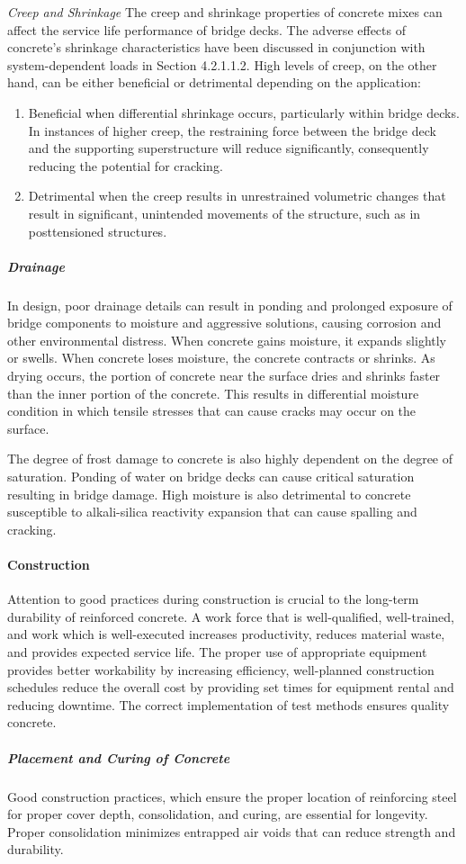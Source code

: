 \emph{Creep and Shrinkage} The creep and shrinkage properties of concrete mixes can affect the service life performance of bridge decks. The adverse effects of concrete’s shrinkage characteristics have been discussed in conjunction with system-dependent loads in Section 4.2.1.1.2. High levels of creep, on the other hand, can be either beneficial or detrimental depending on the application: 
\begin{enumerate}
  \item Beneficial when differential shrinkage occurs, particularly within bridge decks. In instances of higher creep, the restraining force between the bridge deck and the supporting superstructure will reduce significantly, consequently reducing the potential for cracking. 
  \item Detrimental when the creep results in unrestrained volumetric changes that result in significant, unintended movements of the structure, such as in posttensioned structures.
\end{enumerate}


\subparagraph{Drainage}

In design, poor drainage details can result in ponding and prolonged exposure of bridge components to moisture and aggressive solutions, causing corrosion and other environmental distress. When concrete gains moisture, it expands slightly or swells. When concrete loses moisture, the concrete contracts or shrinks. As drying occurs, the portion of concrete near the surface dries and shrinks faster than the inner portion of the concrete. This results in differential moisture condition in which tensile stresses that can cause cracks may occur on the surface.

The degree of frost damage to concrete is also highly dependent on the degree of saturation. Ponding of water on
bridge decks can cause critical saturation resulting in bridge damage. High moisture is also detrimental to concrete
susceptible to alkali-silica reactivity expansion that can cause spalling and cracking.

\paragraph{Construction}
Attention to good practices during construction is crucial to the long-term durability of reinforced concrete. A
work force that is well-qualified, well-trained, and work which is well-executed increases productivity, reduces
material waste, and provides expected service life. The proper use of appropriate equipment provides better
workability by increasing efficiency, well-planned construction schedules reduce the overall cost by providing set
times for equipment rental and reducing downtime. The correct implementation of test methods ensures quality
concrete.
\subparagraph{Placement and Curing of Concrete}
Good construction practices, which ensure the proper location of reinforcing steel for proper cover depth,
consolidation, and curing, are essential for longevity. Proper consolidation minimizes entrapped air voids that can
reduce strength and durability.

